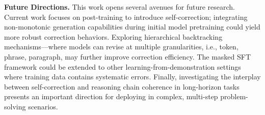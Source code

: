 \textbf{Future Directions.}
This work opens several avenues for future research.
Current work focuses on post-training to introduce self-correction; integrating non-monotonic generation capabilities during initial model pretraining could yield more robust correction behaviors.
Exploring hierarchical backtracking mechanisms—where models can revise at multiple granularities, i.e., token, phrase, paragraph, may further improve correction efficiency.
The masked SFT framework could be extended to other learning-from-demonstration settings where training data contains systematic errors.
Finally, investigating the interplay between self-correction and reasoning chain coherence in long-horizon tasks presents an important direction for deploying \modelname in complex, multi-step problem-solving scenarios.